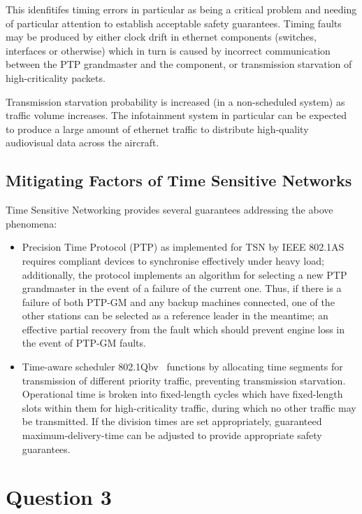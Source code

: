 This idenfitifes timing errors in particular as being a critical problem and needing of particular attention to establish acceptable safety guarantees.
Timing faults may be produced by either clock drift in ethernet components (switches, interfaces or otherwise) which in turn is caused by incorrect communication between the PTP grandmaster and the component, or transmission starvation of high-criticality packets.

Transmission starvation probability is increased (in a non-scheduled system) as traffic volume increases.
The infotainment system in particular can be expected to produce a large amount of ethernet traffic to distribute high-quality audiovisual data across the aircraft.

\subsection{Mitigating Factors of Time Sensitive Networks}

Time Sensitive Networking provides several guarantees addressing the above phenomena:

\begin{itemize}
    \item Precision Time Protocol (PTP) as implemented for TSN by IEEE 802.1AS~\cite{IEEEStandardLocal2020} requires compliant devices to synchronise effectively under heavy load; additionally, the protocol implements an algorithm for selecting a new PTP grandmaster in the event of a failure of the current one.
    Thus, if there is a failure of both PTP-GM and any backup machines connected, one of the other stations can be selected as a reference leader in the meantime; an effective partial recovery from the fault which should prevent engine loss in the event of PTP-GM faults.
    \item Time-aware scheduler 802.1Qbv~\cite{IEEEStandardLocal2016a} functions by allocating time segments for transmission of different priority traffic, preventing transmission starvation.
    Operational time is broken into fixed-length cycles which have fixed-length slots within them for high-criticality traffic, during which no other traffic may be transmitted.
    If the division times are set appropriately, guaranteed maximum-delivery-time can be adjusted to provide appropriate safety guarantees.
\end{itemize}

\section{Question 3}


